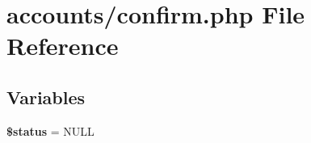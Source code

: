 \hypertarget{confirm_8php}{\section{accounts/confirm.php File Reference}
\label{confirm_8php}
}
\subsection*{Variables}
\begin{DoxyCompactItemize}
\item 
\hypertarget{confirm_8php_a58391ea75f2d29d5d708d7050b641c33}{{\bfseries \$status} = N\-U\-L\-L}\label{confirm_8php_a58391ea75f2d29d5d708d7050b641c33}

\end{DoxyCompactItemize}
